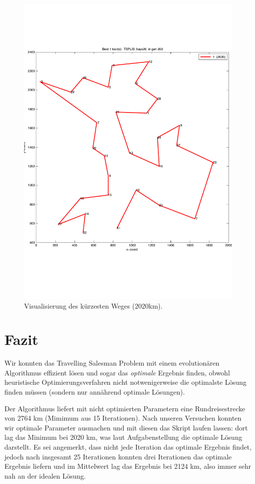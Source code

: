 \begin{figure}[!h] \centering
  \includegraphics[width=1.0\textwidth]{Figures/path.pdf}
  \caption{Visualisierung des kürzesten Weges (2020km).}
  \label{fig.optPath}
\end{figure}



\section{Fazit}\label{conclusion}

Wir konnten das Travelling Salesman Problem
mit einem evolutionären Algorithmus effizient lösen
und sogar das \emph{optimale} Ergebnis finden, obwohl heuristische
Optimierungsverfahren nicht notwenigerweise die optimalste Lösung finden müssen
(sondern nur annährend optimale Lösungen).

Der Algorithmus liefert mit nicht optimierten Parametern eine Rundreisestrecke
von 2764 km (Mimimum aus 15 Iterationen).
Nach unseren Versuchen konnten wir optimale Parameter ausmachen und mit diesen
das Skript laufen lassen: dort lag das Minimum bei 2020 km, was laut Aufgabenstellung
die optimale Lösung darstellt.
Es sei angemerkt, dass nicht jede Iteration das optimale Ergebnis findet,
jedoch nach insgesamt 25 Iterationen konnten drei Iterationen das optimale
Ergebnis liefern und im Mittelwert lag das Ergebnis bei 2124 km,
also immer sehr nah an der idealen Lösung.

